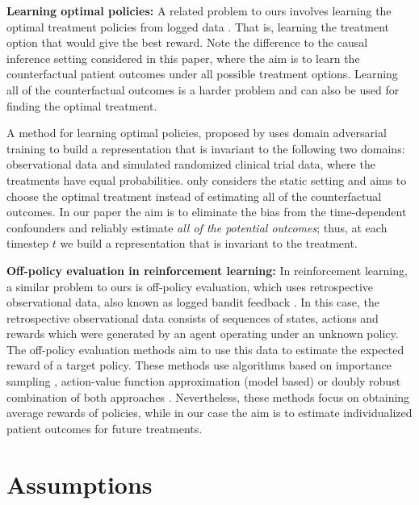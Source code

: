 \documentclass{article} %
\begin{document}
	\textbf{Learning optimal policies:} A related problem to ours involves learning the optimal treatment policies from logged data \citep{swaminathan2015batch, swaminathan2015self, atan2018learning}. That is, learning the treatment option that would give the best reward. Note the difference to the causal inference setting considered in this paper, where the aim is to learn the counterfactual patient outcomes under all possible treatment options. Learning all of the counterfactual outcomes is a harder problem and can also be used for finding the optimal treatment. 
	
	A method for learning optimal policies, proposed by \cite{atan2018learning} uses domain adversarial training to build a representation that is invariant to the following two domains: observational data and simulated randomized clinical trial data, where the treatments have equal probabilities. \cite{atan2018learning} only considers the static setting and aims to choose the optimal treatment instead of estimating all of the counterfactual outcomes. In our paper the aim is to eliminate the bias from the time-dependent confounders and reliably estimate \emph{all of the potential outcomes}; thus, at each timestep $t$ we build a representation that is invariant to the treatment.
	
	\textbf{Off-policy evaluation in reinforcement learning:} In reinforcement learning, a similar problem to ours is off-policy evaluation, which uses retrospective observational data, also known as logged bandit feedback \citep{hoiles2016non, puaduraru2013empirical, doroudi2017importance}. In this case, the retrospective observational data consists of sequences of states, actions and rewards which were generated by an agent operating under an unknown policy. The off-policy evaluation methods aim to use this data to estimate the expected reward of a target policy. These methods use algorithms based on importance sampling \citep{precup2000eligibility, thomas2015high, guo2017using}, action-value function approximation (model based) \citep{hallak2015off} or doubly robust combination of both approaches \citep{jiang2015doubly}. Nevertheless, these methods focus on obtaining average rewards of policies, while in our case the aim is to estimate individualized patient outcomes for future treatments. 
	
	
	\section{Assumptions} \label{apx:assumptions}
	
\end{document}
